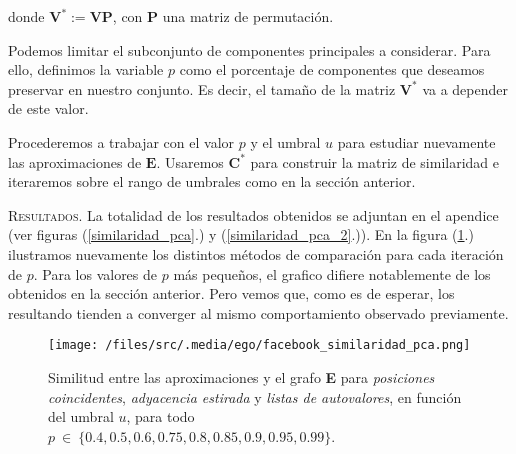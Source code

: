 \vspace{1em}
\noindent donde $\mathbf{V}^* := \mathbf{V} \mathbf{P}$, con \textbf{P} una matriz de permutación.



\vspace{1em}
Podemos limitar el subconjunto de componentes principales a considerar. Para ello, definimos la variable $p$ como el porcentaje de componentes que deseamos preservar en nuestro conjunto. Es decir, el tamaño de la matriz $\textbf{V}^*$ va a depender de este valor.


\vspace{1em}
Procederemos a trabajar con el valor $p$ y el umbral $u$ para estudiar nuevamente las aproximaciones de $\textbf{E}$.
Usaremos $\textbf{C}^*$ para construir la matriz de similaridad e iteraremos sobre el rango de umbrales como en la sección anterior.

\vspace{2em}
\noindent \textsc{Resultados}. La totalidad de los resultados obtenidos se adjuntan en el apendice (ver figuras (\ref{similaridad_pca}.) y (\ref{similaridad_pca_2}.)). 
En la figura (\ref{grafo_correlaciones_pca}.) ilustramos nuevamente los distintos métodos de comparación para cada iteración de $p$.
Para los valores de $p$ más pequeños, el grafico difiere notablemente de los obtenidos en la sección anterior. 
Pero vemos que, como es de esperar, los resultando tienden a converger al mismo comportamiento observado previamente.

\begin{figure}[!htbp]
    \centering
    \texttt{[image: /files/src/.media/ego/facebook\_similaridad\_pca.png]}
    \caption{Similitud entre las aproximaciones y el grafo \textbf{E} para \textit{posiciones coincidentes}, \textit{adyacencia estirada} y \textit{listas de autovalores}, en función del umbral $u$, para todo $p\ \in\ \{0.4, 0.5, 0.6, 0.75, 0.8, 0.85, 0.9, 0.95, 0.99\}$.}
    \label{grafo_correlaciones_pca}
\end{figure}

